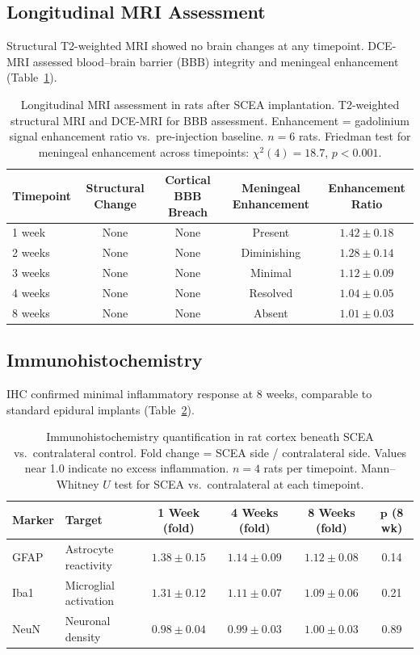 \documentclass[11pt]{article}
\begin{document}
\subsection{Longitudinal MRI Assessment}

Structural T2-weighted MRI showed no brain changes at any timepoint. DCE-MRI assessed blood--brain barrier (BBB) integrity and meningeal enhancement (Table~\ref{tab:mri}).

\begin{table}[H]
\centering
\caption{Longitudinal MRI assessment in rats after SCEA implantation. T2-weighted structural MRI and DCE-MRI for BBB assessment. Enhancement = gadolinium signal enhancement ratio vs.\ pre-injection baseline. $n = 6$ rats. Friedman test for meningeal enhancement across timepoints: $\chi^2(4) = 18.7$, $p < 0.001$.}
\label{tab:mri}
\begin{tabular}{lcccc}
\toprule
\textbf{Timepoint} & \textbf{Structural Change} & \textbf{Cortical BBB Breach} & \textbf{Meningeal Enhancement} & \textbf{Enhancement Ratio} \\
\midrule
1 week & None & None & Present & $1.42 \pm 0.18$ \\
2 weeks & None & None & Diminishing & $1.28 \pm 0.14$ \\
3 weeks & None & None & Minimal & $1.12 \pm 0.09$ \\
4 weeks & None & None & Resolved & $1.04 \pm 0.05$ \\
8 weeks & None & None & Absent & $1.01 \pm 0.03$ \\
\bottomrule
\end{tabular}
\end{table}

\subsection{Immunohistochemistry}

IHC confirmed minimal inflammatory response at 8 weeks, comparable to standard epidural implants (Table~\ref{tab:ihc}).

\begin{table}[H]
\centering
\caption{Immunohistochemistry quantification in rat cortex beneath SCEA vs.\ contralateral control. Fold change = SCEA side / contralateral side. Values near 1.0 indicate no excess inflammation. $n = 4$ rats per timepoint. Mann--Whitney $U$ test for SCEA vs.\ contralateral at each timepoint.}
\label{tab:ihc}
\begin{tabular}{llcccc}
\toprule
\textbf{Marker} & \textbf{Target} & \textbf{1 Week (fold)} & \textbf{4 Weeks (fold)} & \textbf{8 Weeks (fold)} & $\boldsymbol{p}$ \textbf{(8 wk)} \\
\midrule
GFAP & Astrocyte reactivity & $1.38 \pm 0.15$ & $1.14 \pm 0.09$ & $1.12 \pm 0.08$ & 0.14 \\
Iba1 & Microglial activation & $1.31 \pm 0.12$ & $1.11 \pm 0.07$ & $1.09 \pm 0.06$ & 0.21 \\
NeuN & Neuronal density & $0.98 \pm 0.04$ & $0.99 \pm 0.03$ & $1.00 \pm 0.03$ & 0.89 \\
\bottomrule
\end{tabular}
\end{table}
\end{document}
